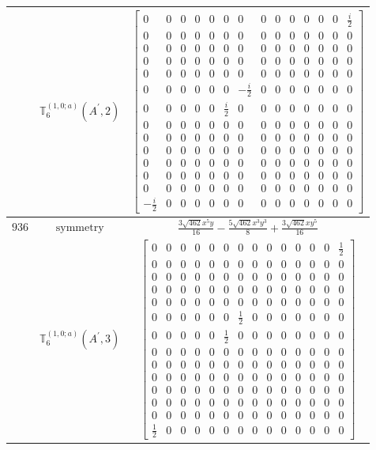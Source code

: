 \documentclass[fleqn,8pt,landscape]{jsarticle}
\begin{document}
\begin{longtable}{ccc}
$  $ & $ \mathbb{T}_{6}^{(1,0;a)}(A^{\prime},2) $ & $ \begin{bmatrix} 0 & 0 & 0 & 0 & 0 & 0 & 0 & 0 & 0 & 0 & 0 & 0 & 0 & \frac{i}{2} \\ 0 & 0 & 0 & 0 & 0 & 0 & 0 & 0 & 0 & 0 & 0 & 0 & 0 & 0 \\ 0 & 0 & 0 & 0 & 0 & 0 & 0 & 0 & 0 & 0 & 0 & 0 & 0 & 0 \\ 0 & 0 & 0 & 0 & 0 & 0 & 0 & 0 & 0 & 0 & 0 & 0 & 0 & 0 \\ 0 & 0 & 0 & 0 & 0 & 0 & 0 & 0 & 0 & 0 & 0 & 0 & 0 & 0 \\ 0 & 0 & 0 & 0 & 0 & 0 & - \frac{i}{2} & 0 & 0 & 0 & 0 & 0 & 0 & 0 \\ 0 & 0 & 0 & 0 & 0 & \frac{i}{2} & 0 & 0 & 0 & 0 & 0 & 0 & 0 & 0 \\ 0 & 0 & 0 & 0 & 0 & 0 & 0 & 0 & 0 & 0 & 0 & 0 & 0 & 0 \\ 0 & 0 & 0 & 0 & 0 & 0 & 0 & 0 & 0 & 0 & 0 & 0 & 0 & 0 \\ 0 & 0 & 0 & 0 & 0 & 0 & 0 & 0 & 0 & 0 & 0 & 0 & 0 & 0 \\ 0 & 0 & 0 & 0 & 0 & 0 & 0 & 0 & 0 & 0 & 0 & 0 & 0 & 0 \\ 0 & 0 & 0 & 0 & 0 & 0 & 0 & 0 & 0 & 0 & 0 & 0 & 0 & 0 \\ 0 & 0 & 0 & 0 & 0 & 0 & 0 & 0 & 0 & 0 & 0 & 0 & 0 & 0 \\ - \frac{i}{2} & 0 & 0 & 0 & 0 & 0 & 0 & 0 & 0 & 0 & 0 & 0 & 0 & 0 \end{bmatrix} $ \\ \hline
$ 936 $ & $ \text{symmetry} $ & $ \frac{3 \sqrt{462} x^{5} y}{16} - \frac{5 \sqrt{462} x^{3} y^{3}}{8} + \frac{3 \sqrt{462} x y^{5}}{16} $ \\
$  $ & $ \mathbb{T}_{6}^{(1,0;a)}(A^{\prime},3) $ & $ \begin{bmatrix} 0 & 0 & 0 & 0 & 0 & 0 & 0 & 0 & 0 & 0 & 0 & 0 & 0 & \frac{1}{2} \\ 0 & 0 & 0 & 0 & 0 & 0 & 0 & 0 & 0 & 0 & 0 & 0 & 0 & 0 \\ 0 & 0 & 0 & 0 & 0 & 0 & 0 & 0 & 0 & 0 & 0 & 0 & 0 & 0 \\ 0 & 0 & 0 & 0 & 0 & 0 & 0 & 0 & 0 & 0 & 0 & 0 & 0 & 0 \\ 0 & 0 & 0 & 0 & 0 & 0 & 0 & 0 & 0 & 0 & 0 & 0 & 0 & 0 \\ 0 & 0 & 0 & 0 & 0 & 0 & \frac{1}{2} & 0 & 0 & 0 & 0 & 0 & 0 & 0 \\ 0 & 0 & 0 & 0 & 0 & \frac{1}{2} & 0 & 0 & 0 & 0 & 0 & 0 & 0 & 0 \\ 0 & 0 & 0 & 0 & 0 & 0 & 0 & 0 & 0 & 0 & 0 & 0 & 0 & 0 \\ 0 & 0 & 0 & 0 & 0 & 0 & 0 & 0 & 0 & 0 & 0 & 0 & 0 & 0 \\ 0 & 0 & 0 & 0 & 0 & 0 & 0 & 0 & 0 & 0 & 0 & 0 & 0 & 0 \\ 0 & 0 & 0 & 0 & 0 & 0 & 0 & 0 & 0 & 0 & 0 & 0 & 0 & 0 \\ 0 & 0 & 0 & 0 & 0 & 0 & 0 & 0 & 0 & 0 & 0 & 0 & 0 & 0 \\ 0 & 0 & 0 & 0 & 0 & 0 & 0 & 0 & 0 & 0 & 0 & 0 & 0 & 0 \\ \frac{1}{2} & 0 & 0 & 0 & 0 & 0 & 0 & 0 & 0 & 0 & 0 & 0 & 0 & 0 \end{bmatrix} $ \\ \hline

\end{longtable}
\end{document}
